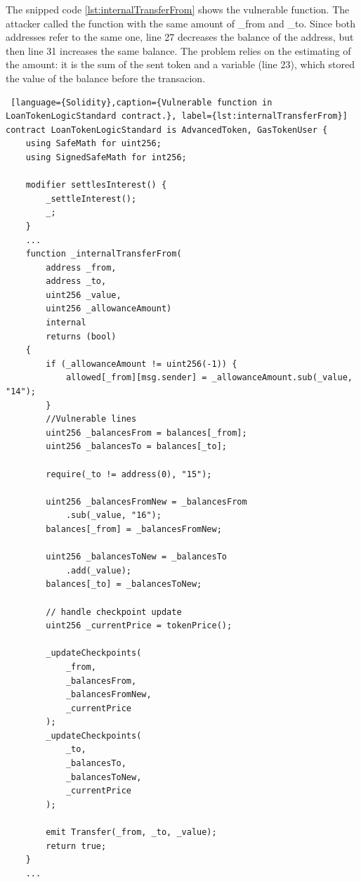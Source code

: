 The snipped code \autoref{lst:internalTransferFrom} shows the vulnerable function. 
The attacker called the function with the same amount of \_from and \_to. 
Since both addresses refer to the same one, line 27 decreases the balance of the address, but then line 31 increases the same balance. 
The problem relies on the estimating of the amount: it is the sum of the sent token and 
a variable (line 23), which stored the value of the balance before the transacion.

\begin{lstlisting} [language={Solidity},caption={Vulnerable function in LoanTokenLogicStandard contract.}, label={lst:internalTransferFrom}]
contract LoanTokenLogicStandard is AdvancedToken, GasTokenUser {
    using SafeMath for uint256;
    using SignedSafeMath for int256;

    modifier settlesInterest() {
        _settleInterest();
        _;
    }
    ... 
    function _internalTransferFrom(
        address _from,
        address _to,
        uint256 _value,
        uint256 _allowanceAmount)
        internal
        returns (bool)
    {
        if (_allowanceAmount != uint256(-1)) {
            allowed[_from][msg.sender] = _allowanceAmount.sub(_value, "14");
        }
        //Vulnerable lines 
        uint256 _balancesFrom = balances[_from];
        uint256 _balancesTo = balances[_to];

        require(_to != address(0), "15");

        uint256 _balancesFromNew = _balancesFrom
            .sub(_value, "16");
        balances[_from] = _balancesFromNew;

        uint256 _balancesToNew = _balancesTo
            .add(_value);
        balances[_to] = _balancesToNew;

        // handle checkpoint update
        uint256 _currentPrice = tokenPrice();

        _updateCheckpoints(
            _from,
            _balancesFrom,
            _balancesFromNew,
            _currentPrice
        );
        _updateCheckpoints(
            _to,
            _balancesTo,
            _balancesToNew,
            _currentPrice
        );

        emit Transfer(_from, _to, _value);
        return true;
    }
    ... 
\end{lstlisting}

